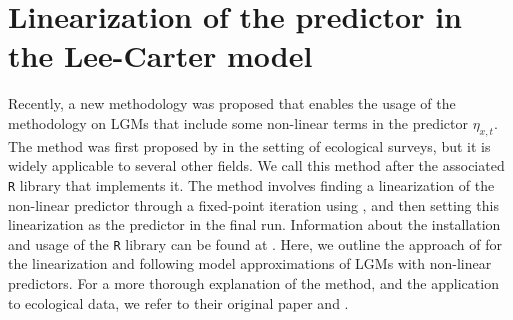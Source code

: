 \newpage
\section{Linearization of the predictor in the Lee-Carter model}
\label{sec:inlabru}


Recently, a new methodology was proposed that enables the usage of the \inla methodology on LGMs that include some non-linear terms in the predictor $\eta_{x,t}$. The method was first proposed by \textcite{BachlLindgren2019} in the setting of ecological surveys, but it is widely applicable to several other fields. We call this method \inlabru after the associated \texttt{R} library that implements it. The \inlabru method involves finding a linearization of the non-linear predictor through a fixed-point iteration using \inla, and then setting this linearization as the predictor in the final \inla run. Information about the installation and usage of the \inlabru \texttt{R} library can be found at \textcite{Inlabru}. Here, we outline the approach of \textcite{BachlLindgren2019} for the linearization and following model approximations of LGMs with non-linear predictors. For a more thorough explanation of the method, and the application to ecological data, we refer to their original paper \parencite{BachlLindgren2019} and \textcite{Inlabru}.

